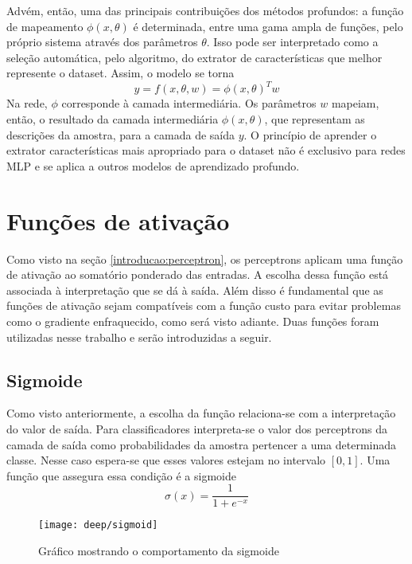 Advém, então, uma das principais contribuições dos métodos profundos: a função de mapeamento $\phi(x,\theta)$ é determinada, entre uma gama ampla de funções, pelo próprio sistema através dos parâmetros $\theta$. Isso pode ser interpretado como a seleção automática, pelo algoritmo, do extrator de características que melhor represente o dataset. Assim, o modelo se torna 
\begin{equation}
y=f(x,\theta,w) = \phi(x,\theta)^Tw
\end{equation}
Na rede, $\phi$ corresponde à camada intermediária. Os parâmetros $w$ mapeiam, então, o resultado da camada intermediária $\phi(x,\theta)$, que representam as descrições da amostra, para a camada de saída $y$. O princípio de aprender o extrator características mais apropriado para o dataset não é exclusivo para redes MLP e se aplica a outros modelos de aprendizado profundo.

\section{Funções de ativação}
Como visto na seção \ref{introducao:perceptron}, os perceptrons aplicam uma função de ativação ao somatório ponderado das entradas. A escolha dessa função está associada à interpretação que se dá à saída. Além disso é fundamental que as funções de ativação sejam compatíveis com a função custo para evitar problemas como o gradiente enfraquecido, como será visto adiante. Duas funções foram utilizadas nesse trabalho e serão introduzidas a seguir.

\subsection{Sigmoide}
Como visto anteriormente, a escolha da função relaciona-se com a interpretação do valor de saída. Para classificadores interpreta-se o valor dos perceptrons da camada de saída como probabilidades da amostra pertencer a uma determinada classe. Nesse caso espera-se que esses valores estejam no intervalo $[0,1]$. Uma função que assegura essa condição é a sigmoide
\begin{equation}
	\label{eq:sigm}
	\sigma(x) = \frac{1}{1+e^{-x}}
\end{equation}

\begin{figure}[h]
\centering
\texttt{[image: deep/sigmoid]}
\caption{Gráfico mostrando o comportamento da sigmoide}
\label{fig:sigmoid}
\end{figure}

